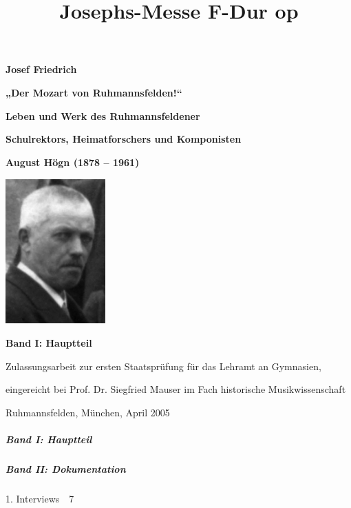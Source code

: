 \documentclass[a4paper]{article}
\title{Josephs-Messe F-Dur op}
\begin{document}
\clearpage{}
{\centering\bfseries
Josef Friedrich
\par}

{\centering
\textbf{„Der Mozart von Ruhmannsfelden!“}
\par}

{\centering\bfseries
\textmd{Leben und Werk des Ruhmannsfeldener }
\par}

{\centering\bfseries
\textmd{Schulrektors, Heimatforschers und Komponisten }
\par}

{\centering\bfseries
\textmd{August Högn (1878 – 1961)}
\par}

{\centering
\includegraphics[width=3.836cm,height=5.556cm]{pictures/zulassungsarbeit-img002.jpg}
 \par}
{\centering\bfseries
Band I: Hauptteil
\par}

{\centering
Zulassungsarbeit zur ersten Staatsprüfung für das Lehramt an Gymnasien,
\par}

{\centering
eingereicht bei Prof. Dr. Siegfried Mauser im Fach historische
Musikwissenschaft
\par}

{\centering
Ruhmannsfelden, München, April 2005
\par}


\subparagraph[Band I: Hauptteil]{Band I: Hauptteil}
\setcounter{tocdepth}{4}
\renewcommand\contentsname{}
\tableofcontents
\clearpage\subparagraph{Band II: Dokumentation}
1. Interviews\ \ 7
\end{document}
